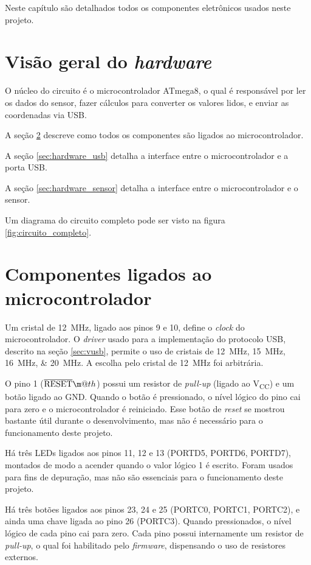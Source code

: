 \documentclass[brazil,pagestart=firstchapter]{abnt}
\makeatletter
\newcommand*{\textoverline}[1]{$\overline{\hbox{#1}}\m@th$}
\newcommand*{\VCC}{V\textsubscript{CC}\xspace}
\newcommand*{\GND}{GND\xspace}
\makeatother
\begin{document}
Neste capítulo são detalhados todos os componentes eletrônicos usados neste
projeto.
\newpage


\section{Visão geral do \textit{hardware}}
\label{sec:hardware_visao_geral}

O núcleo do circuito é o microcontrolador ATmega8, o qual é responsável por
ler os dados do sensor, fazer cálculos para converter os valores lidos, e
enviar as coordenadas via \ac{USB}.

A seção \ref{sec:hardware_microcontrolador} descreve como todos os
componentes são ligados ao microcontrolador.

A seção \ref{sec:hardware_usb} detalha a interface entre o microcontrolador
e a porta \ac{USB}.

A seção \ref{sec:hardware_sensor} detalha a interface entre o
microcontrolador e o sensor.

Um diagrama do circuito completo pode ser visto na figura
\ref{fig:circuito_completo}.


\section{Componentes ligados ao microcontrolador}
\label{sec:hardware_microcontrolador}

Um cristal de \SI{12}{\mega\hertz}, ligado aos pinos 9 e 10, define o
\textit{clock} do microcontrolador. O \textit{driver} usado para a
implementação do protocolo \ac{USB}, descrito na seção \ref{sec:vusb},
permite o uso de cristais de \SIlist[list-final-separator={ ou }]{12; 15;
16; 20}{\mega\hertz}. A escolha pelo cristal de \SI{12}{\mega\hertz} foi
arbitrária.

O pino 1 (\textoverline{RESET}) possui um resistor de \textit{pull-up}
(ligado ao \VCC) e um botão ligado ao \GND. Quando o botão é pressionado, o
nível lógico do pino cai para zero e o microcontrolador é reiniciado. Esse
botão de \textit{reset} se mostrou bastante útil durante o desenvolvimento,
mas não é necessário para o funcionamento deste projeto.

Há três \acp{LED} ligados aos pinos 11, 12 e 13 (PORTD5, PORTD6, PORTD7),
montados de modo a acender quando o valor lógico 1 é escrito. Foram usados
para fins de depuração, mas não são essenciais para o funcionamento deste
projeto.

Há três botões ligados aos pinos 23, 24 e 25 (PORTC0, PORTC1, PORTC2), e
ainda uma chave ligada ao pino 26 (PORTC3). Quando pressionados, o nível
lógico de cada pino cai para zero. Cada pino possui internamente um resistor
de \textit{pull-up}, o qual foi habilitado pelo \textit{firmware},
dispensando o uso de resistores externos.
\end{document}
